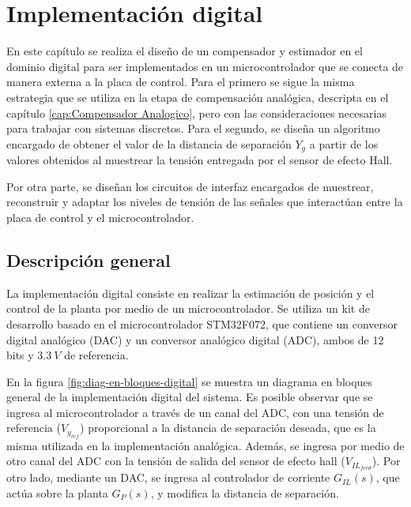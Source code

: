 \chapter{Implementación digital}  \label{cap:Implementacion digital}

En este capítulo se realiza el diseño de un compensador y estimador en el dominio digital para ser implementados en un microcontrolador que se conecta de manera externa a la placa de control. Para el primero se sigue la misma estrategia que se utiliza en la etapa de compensación analógica, descripta en el capítulo \ref{cap:Compensador Analogico}, pero con las consideraciones necesarias para trabajar con sistemas discretos. Para el segundo, se diseña un algoritmo encargado de obtener el valor de la distancia de separación $Y_g$ a partir de los valores obtenidos al muestrear la tensión entregada por el sensor de efecto Hall.

Por otra parte, se diseñan los circuitos de interfaz encargados de muestrear, reconstruir y adaptar los niveles de tensión de las señales que interactúan entre la placa de control y el microcontrolador.


\section{Descripción general}

 La implementación digital consiste en realizar la estimación de posición y el control de la planta por medio de un microcontrolador. Se utiliza un kit de desarrollo basado en el microcontrolador STM32F072, que contiene un conversor digital analógico (DAC) y un conversor analógico digital (ADC), ambos de 12 bits y $3.3\:V$ de referencia. 

 En la figura \ref{fig:diag-en-bloques-digital} se muestra un diagrama en bloques general de la implementación digital del sistema. Es posible observar que se ingresa al microcontrolador a través de un canal del ADC, con una tensión de referencia ($V_{y_{ref}}$) proporcional a la distancia de separación deseada, que es la misma utilizada en la implementación analógica. Además, se ingresa por medio de otro canal del ADC con la tensión de salida del sensor de efecto hall ($V_{IL_{feed}}$). Por otro lado, mediante un DAC, se ingresa al controlador de corriente $G_{IL}(s)$, que actúa sobre la planta $G_P(s)$, y modifica la distancia de separación.




